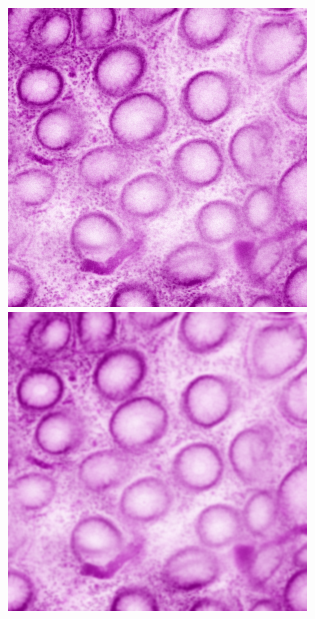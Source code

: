 \begin{figure}[H]
\begin{minipage}{0.24\columnwidth}
		\includegraphics[clip, width=\linewidth]{fig/preprocessing/data_aug/color/blur/blur_0_50}
	\end{minipage}
	\begin{minipage}{0.24\columnwidth}
		\centering
		\includegraphics[clip, width=\linewidth]{fig/preprocessing/data_aug/color/blur/blur_1_00}

\end{minipage}
\end{figure}
